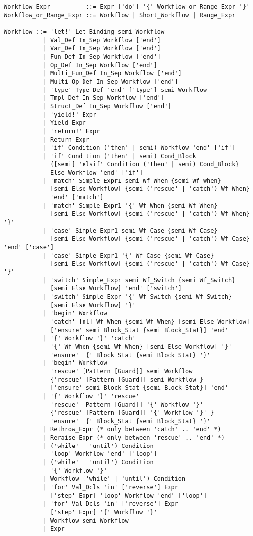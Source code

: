 \syntax\begin{lstlisting}
Workflow_Expr          ::= Expr ['do'] '{' Workflow_or_Range_Expr '}'
Workflow_or_Range_Expr ::= Workflow | Short_Workflow | Range_Expr

Workflow ::= 'let!' Let_Binding semi Workflow
           | Val_Def In_Sep Workflow ['end']
           | Var_Def In_Sep Workflow ['end']
           | Fun_Def In_Sep Workflow ['end']
           | Op_Def In_Sep Workflow ['end']
           | Multi_Fun_Def In_Sep Workflow ['end']
           | Multi_Op_Def In_Sep Workflow ['end']
           | 'type' Type_Def 'end' ['type'] semi Workflow
           | Tmpl_Def In_Sep Workflow ['end']
           | Struct_Def In_Sep Workflow ['end']
           | 'yield!' Expr
           | Yield_Expr
           | 'return!' Expr
           | Return_Expr
           | 'if' Condition ('then' | semi) Workflow 'end' ['if']
           | 'if' Condition ('then' | semi) Cond_Block 
             {[semi] 'elsif' Condition ('then' | semi) Cond_Block}
             Else Workflow 'end' ['if']
           | 'match' Simple_Expr1 semi Wf_When {semi Wf_When}
             [semi Else Workflow] {semi ('rescue' | 'catch') Wf_When} 
             'end' ['match']
           | 'match' Simple_Expr1 '{' Wf_When {semi Wf_When}
             [semi Else Workflow] {semi ('rescue' | 'catch') Wf_When} '}'
           | 'case' Simple_Expr1 semi Wf_Case {semi Wf_Case}
             [semi Else Workflow] {semi ('rescue' | 'catch') Wf_Case} 'end' ['case']
           | 'case' Simple_Expr1 '{' Wf_Case {semi Wf_Case}
             [semi Else Workflow] {semi ('rescue' | 'catch') Wf_Case} '}'
           | 'switch' Simple_Expr semi Wf_Switch {semi Wf_Switch}
             [semi Else Workflow] 'end' ['switch']
           | 'switch' Simple_Expr '{' Wf_Switch {semi Wf_Switch}
             [semi Else Workflow] '}'
           | 'begin' Workflow 
             'catch' [nl] Wf_When {semi Wf_When} [semi Else Workflow]
             ['ensure' semi Block_Stat {semi Block_Stat}] 'end'
           | '{' Workflow '}' 'catch' 
             '{' Wf_When {semi Wf_When} [semi Else Workflow] '}'
             'ensure' '{' Block_Stat {semi Block_Stat} '}'
           | 'begin' Workflow 
             'rescue' [Pattern [Guard]] semi Workflow
             {'rescue' [Pattern [Guard]] semi Workflow }
             ['ensure' semi Block_Stat {semi Block_Stat}] 'end'
           | '{' Workflow '}' 'rescue' 
             'rescue' [Pattern [Guard]] '{' Workflow '}'
             {'rescue' [Pattern [Guard]] '{' Workflow '}' }
             'ensure' '{' Block_Stat {semi Block_Stat} '}'
           | Rethrow_Expr (* only between 'catch' .. 'end' *)
           | Reraise_Expr (* only between 'rescue' .. 'end' *)
           | ('while' | 'until') Condition 
             'loop' Workflow 'end' ['loop']
           | ('while' | 'until') Condition 
             '{' Workflow '}'
           | Workflow ('while' | 'until') Condition
           | 'for' Val_Dcls 'in' ['reverse'] Expr
             ['step' Expr] 'loop' Workflow 'end' ['loop']
           | 'for' Val_Dcls 'in' ['reverse'] Expr
             ['step' Expr] '{' Workflow '}'
           | Workflow semi Workflow
           | Expr
           

\end{lstlisting}
